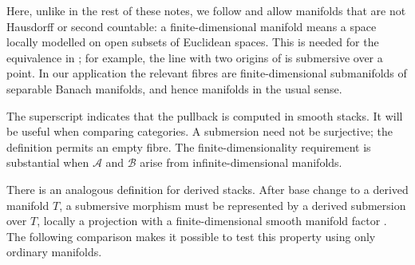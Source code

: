 
Here, unlike in the rest of these notes, we follow
\citet[Definition~2.1.53]{Steffens_Representability_Elliptic_Moduli} and
allow manifolds that are not Hausdorff or second countable: a
finite-dimensional manifold means a space locally modelled on open
subsets of Euclidean spaces. This is needed for the equivalence in
; for example, the line
with two origins of  is submersive over a
point. In our application the relevant fibres are finite-dimensional
submanifolds of separable Banach manifolds, and hence manifolds in the
usual sense.

The superscript indicates that the pullback is computed in smooth
stacks. It will be useful when comparing categories.
A submersion need not be surjective; the definition permits an empty
fibre. The finite-dimensionality requirement is substantial when
$\mathcal A$ and $\mathcal B$ arise from infinite-dimensional manifolds.

There is an analogous definition for derived stacks.
After base change to a derived manifold $T$, a submersive morphism
must be represented by a derived submersion over $T$, locally a
projection with a finite-dimensional smooth manifold factor
\cite[Definition~2.1.53]{Steffens_Representability_Elliptic_Moduli}.
The following comparison makes it possible to test this property using
only ordinary manifolds.


